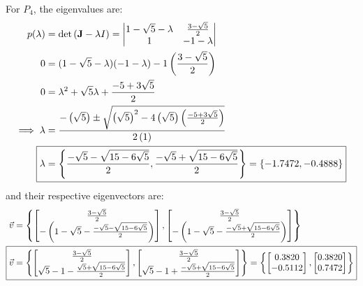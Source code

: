 For $P_4$, the eigenvalues are:
\begin{align*}
    p(\lambda) &= \det\left(\textbf{J}-\lambda I\right) = \begin{vmatrix}
        1-\sqrt{5}-\lambda & \frac{3-\sqrt{5}}{2}\\
        1 & -1-\lambda
    \end{vmatrix}\\
    0 &= (1-\sqrt{5}-\lambda)(-1-\lambda)-1\left(\frac{3-\sqrt{5}}{2}\right)\\
    0 &= \lambda^2+\sqrt{5}\lambda+\frac{-5+3\sqrt{5}}{2}\\
    \implies \lambda &= \frac{-\left(\sqrt{5}\right) \pm \sqrt{\left(\sqrt{5}\right)^2-4\left(\sqrt{5}\right)\left(\frac{-5+3\sqrt{5}}{2}\right)}}{2\left(1\right)}\\
    \Aboxed{\lambda &= \left\{\frac{-\sqrt{5}-\sqrt{15-6\sqrt{5}}}{2}, \frac{-\sqrt{5}+\sqrt{15-6\sqrt{5}}}{2}\right\} = \left\{-1.7472, -0.4888\right\}}
\end{align*}
and their respective eigenvectors are:
\begin{align*}
    \vec{v} &= \left\{\begin{bmatrix}
        \frac{3-\sqrt{5}}{2}\\
        -\left(1-\sqrt{5}-\frac{-\sqrt{5}-\sqrt{15-6\sqrt{5}}}{2}\right)
    \end{bmatrix}, \begin{bmatrix}
        \frac{3-\sqrt{5}}{2}\\
        -\left(1-\sqrt{5}-\frac{-\sqrt{5}+\sqrt{15-6\sqrt{5}}}{2}\right)
    \end{bmatrix}\right\}\\
    \Aboxed{\vec{v} &= \left\{\begin{bmatrix}
        \frac{3-\sqrt{5}}{2}\\
        \sqrt{5}-1-\frac{\sqrt{5}+\sqrt{15-6\sqrt{5}}}{2}
    \end{bmatrix}, \begin{bmatrix}
        \frac{3-\sqrt{5}}{2}\\
        \sqrt{5}-1+\frac{-\sqrt{5}+\sqrt{15-6\sqrt{5}}}{2}
    \end{bmatrix}\right\} = \left\{\begin{bmatrix}
        0.3820\\
        -0.5112
    \end{bmatrix}, \begin{bmatrix}
        0.3820\\
        0.7472
    \end{bmatrix}\right\}}
\end{align*}

